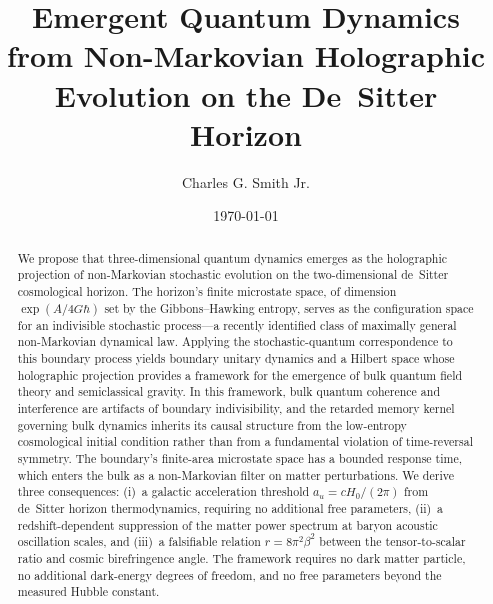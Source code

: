 \documentclass[aps,prd,twocolumn,superscriptaddress,nofootinbib]{revtex4-2}
\begin{document}
\title{Emergent Quantum Dynamics from Non-Markovian Holographic Evolution on the De~Sitter Horizon}

\author{Charles G. Smith Jr.}

\date{\today}

\begin{abstract}
We propose that three-dimensional quantum dynamics emerges as the holographic projection of non-Markovian stochastic evolution on the two-dimensional de~Sitter cosmological horizon. The horizon's finite microstate space, of dimension $\exp(A/4G\hbar)$ set by the Gibbons--Hawking entropy, serves as the configuration space for an indivisible stochastic process---a recently identified class of maximally general non-Markovian dynamical law. Applying the stochastic-quantum correspondence to this boundary process yields boundary unitary dynamics and a Hilbert space whose holographic projection provides a framework for the emergence of bulk quantum field theory and semiclassical gravity. In this framework, bulk quantum coherence and interference are artifacts of boundary indivisibility, and the retarded memory kernel governing bulk dynamics inherits its causal structure from the low-entropy cosmological initial condition rather than from a fundamental violation of time-reversal symmetry. The boundary's finite-area microstate space has a bounded response time, which enters the bulk as a non-Markovian filter on matter perturbations. We derive three consequences: (i)~a galactic acceleration threshold $a_u = cH_0/(2\pi)$ from de~Sitter horizon thermodynamics, requiring no additional free parameters, (ii)~a redshift-dependent suppression of the matter power spectrum at baryon acoustic oscillation scales, and (iii)~a falsifiable relation $r = 8\pi^2\beta^2$ between the tensor-to-scalar ratio and cosmic birefringence angle. The framework requires no dark matter particle, no additional dark-energy degrees of freedom, and no free parameters beyond the measured Hubble constant.
\end{abstract}

\maketitle

\end{document}
